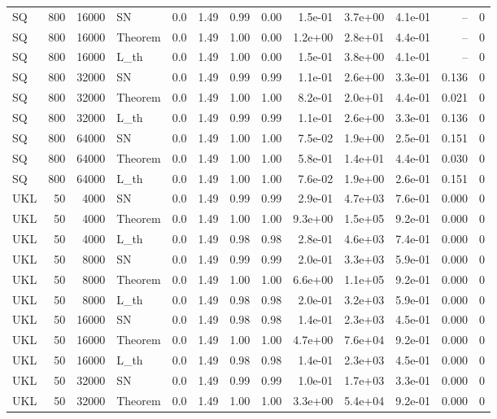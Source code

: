 \begin{tabular}{lrrlrrrrrrrrr}
SQ & 800 & 16000 & SN & 0.0 & 1.49 & 0.99 & 0.00 & 1.5e-01 & 3.7e+00 & 4.1e-01 & -- & 0 \\
SQ & 800 & 16000 & Theorem & 0.0 & 1.49 & 1.00 & 0.00 & 1.2e+00 & 2.8e+01 & 4.4e-01 & -- & 0 \\
SQ & 800 & 16000 & L\_th & 0.0 & 1.49 & 1.00 & 0.00 & 1.5e-01 & 3.8e+00 & 4.1e-01 & -- & 0 \\
SQ & 800 & 32000 & SN & 0.0 & 1.49 & 0.99 & 0.99 & 1.1e-01 & 2.6e+00 & 3.3e-01 & 0.136 & 0 \\
SQ & 800 & 32000 & Theorem & 0.0 & 1.49 & 1.00 & 1.00 & 8.2e-01 & 2.0e+01 & 4.4e-01 & 0.021 & 0 \\
SQ & 800 & 32000 & L\_th & 0.0 & 1.49 & 0.99 & 0.99 & 1.1e-01 & 2.6e+00 & 3.3e-01 & 0.136 & 0 \\
SQ & 800 & 64000 & SN & 0.0 & 1.49 & 1.00 & 1.00 & 7.5e-02 & 1.9e+00 & 2.5e-01 & 0.151 & 0 \\
SQ & 800 & 64000 & Theorem & 0.0 & 1.49 & 1.00 & 1.00 & 5.8e-01 & 1.4e+01 & 4.4e-01 & 0.030 & 0 \\
SQ & 800 & 64000 & L\_th & 0.0 & 1.49 & 1.00 & 1.00 & 7.6e-02 & 1.9e+00 & 2.6e-01 & 0.151 & 0 \\
UKL & 50 & 4000 & SN & 0.0 & 1.49 & 0.99 & 0.99 & 2.9e-01 & 4.7e+03 & 7.6e-01 & 0.000 & 0 \\
UKL & 50 & 4000 & Theorem & 0.0 & 1.49 & 1.00 & 1.00 & 9.3e+00 & 1.5e+05 & 9.2e-01 & 0.000 & 0 \\
UKL & 50 & 4000 & L\_th & 0.0 & 1.49 & 0.98 & 0.98 & 2.8e-01 & 4.6e+03 & 7.4e-01 & 0.000 & 0 \\
UKL & 50 & 8000 & SN & 0.0 & 1.49 & 0.99 & 0.99 & 2.0e-01 & 3.3e+03 & 5.9e-01 & 0.000 & 0 \\
UKL & 50 & 8000 & Theorem & 0.0 & 1.49 & 1.00 & 1.00 & 6.6e+00 & 1.1e+05 & 9.2e-01 & 0.000 & 0 \\
UKL & 50 & 8000 & L\_th & 0.0 & 1.49 & 0.98 & 0.98 & 2.0e-01 & 3.2e+03 & 5.9e-01 & 0.000 & 0 \\
UKL & 50 & 16000 & SN & 0.0 & 1.49 & 0.98 & 0.98 & 1.4e-01 & 2.3e+03 & 4.5e-01 & 0.000 & 0 \\
UKL & 50 & 16000 & Theorem & 0.0 & 1.49 & 1.00 & 1.00 & 4.7e+00 & 7.6e+04 & 9.2e-01 & 0.000 & 0 \\
UKL & 50 & 16000 & L\_th & 0.0 & 1.49 & 0.98 & 0.98 & 1.4e-01 & 2.3e+03 & 4.5e-01 & 0.000 & 0 \\
UKL & 50 & 32000 & SN & 0.0 & 1.49 & 0.99 & 0.99 & 1.0e-01 & 1.7e+03 & 3.3e-01 & 0.000 & 0 \\
UKL & 50 & 32000 & Theorem & 0.0 & 1.49 & 1.00 & 1.00 & 3.3e+00 & 5.4e+04 & 9.2e-01 & 0.000 & 0 \\

\end{tabular}
